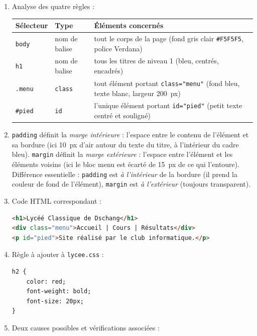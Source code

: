 \documentclass[11pt]{article}
\newcommand{\cle}[1]{{\popxbold\color{popdark}#1}}
\begin{document}
\begin{corrige}
\begin{enumerate}
  \item Analyse des quatre règles :
\begin{center}
\begin{tabularx}{\linewidth}{|l|l|X|}
\hline
\rowcolor{popblueL} \textbf{Sélecteur} & \textbf{Type} & \textbf{Éléments concernés} \\
\hline
\texttt{body} & nom de balise & tout le corps de la page (fond gris clair \texttt{\#F5F5F5}, police Verdana) \\
\hline
\texttt{h1} & nom de balise & tous les titres de niveau 1 (bleu, centrés, encadrés) \\
\hline
\texttt{.menu} & \texttt{class} & tout élément portant \texttt{class="menu"} (fond bleu, texte blanc, largeur \SI{200}{px}) \\
\hline
\texttt{\#pied} & \texttt{id} & l'unique élément portant \texttt{id="pied"} (petit texte centré et souligné) \\
\hline
\end{tabularx}
\end{center}
  \item \texttt{padding} définit la \emph{marge intérieure} : l'espace entre le contenu de l'élément et sa bordure (ici \SI{10}{px} d'air autour du texte du titre, à l'intérieur du cadre bleu). \texttt{margin} définit la \emph{marge extérieure} : l'espace entre l'élément et les éléments voisins (ici le bloc menu est écarté de \SI{15}{px} de ce qui l'entoure). Différence essentielle : \texttt{padding} est \emph{à l'intérieur} de la bordure (il prend la couleur de fond de l'élément), \texttt{margin} est \emph{à l'extérieur} (toujours transparent).
  \item Code \cle{HTML} correspondant :
\begin{lstlisting}[language=HTML]
<h1>Lycéé Classique de Dschang</h1>
<div class="menu">Accueil | Cours | Résultats</div>
<p id="pied">Site réalisé par le club informatique.</p>
\end{lstlisting}
  \item Règle à ajouter à \texttt{lycee.css} :
\begin{lstlisting}
h2 {
    color: red;
    font-weight: bold;
    font-size: 20px;
}
\end{lstlisting}
  \item Deux causes possibles et vérifications associées :
  \begin{itemize}

\end{itemize}
\end{enumerate}
\end{corrige}
\end{document}
